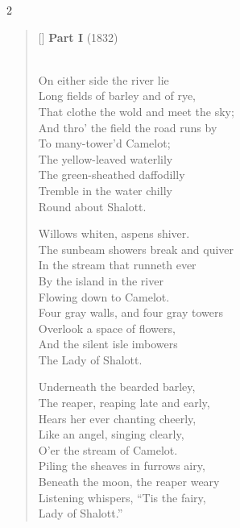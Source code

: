 \begin{paracol}{2}\footnotesize
\settowidth{\versewidth}{The sunbeam showers break and quiver,,}
\begin{verse}[\versewidth]
\textbf{Part I} (1832)
\begin{patverse}
\phantom{.}\\
On either side the river lie\\
Long fields of barley and of rye,\\
That clothe the wold and meet the sky;\\
And thro' the field the road runs by\\
To many-tower'd Camelot;\\
The yellow-leaved waterlily\\
The green-sheathed daffodilly\\
Tremble in the water chilly\\
Round about Shalott.
\end{patverse}

\begin{patverse}
Willows whiten, aspens shiver.\\
The sunbeam showers break and quiver\\
In the stream that runneth ever\\
By the island in the river\\
Flowing down to Camelot.\\
Four gray walls, and four gray towers\\
Overlook a space of flowers,\\
And the silent isle imbowers\\
The Lady of Shalott.
\end{patverse}

\begin{patverse}
Underneath the bearded barley,\\
The reaper, reaping late and early,\\
Hears her ever chanting cheerly,\\
Like an angel, singing clearly,\\
O'er the stream of Camelot.\\
Piling the sheaves in furrows airy,\\
Beneath the moon, the reaper weary\\
Listening whispers, ``Tis the fairy,\\
Lady of Shalott.''
\end{patverse}


\end{verse}
\end{paracol}
